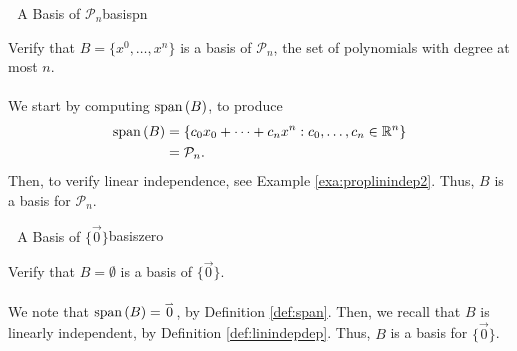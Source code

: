             \begin{example}{\Difficulty\,\Difficulty\,\Difficulty\,\,A Basis of \(\mathcal{P}_n\)}{basispn}

                Verify that \(B=\{x^0,\ldots,x^n\}\) is a basis of \(\mathcal{P}_n\), the set of polynomials with degree at most \(n\).
                \\
                \\
                We start by computing \(\text{span\,}(B)\), to produce
                \begin{align*}
                    \text{span\,}(B)&=\{c_0x_0+\cdots+c_nx^n:c_0,\ldots,c_n\in\mathbb{R}^n\} \\
                    &=\mathcal{P}_n.
                \end{align*}
                Then, to verify linear independence, see Example \ref{exa:proplinindep2}. Thus, \(B\) is a basis for \(\mathcal{P}_n\).
            \end{example}
            \begin{example}{\Difficulty\,\Difficulty\,\Difficulty\,\,A Basis of \(\{\vec{0}\}\)}{basiszero}

                Verify that \(B=\emptyset\) is a basis of \(\{\vec{0}\}\).
                \\
                \\
                We note that \(\text{span\,}(B)=\overset{_{\rightharpoonup}}{0}\), by Definition \ref{def:span}. Then, we recall that \(B\) is linearly independent, by Definition \ref{def:linindepdep}. Thus, \(B\) is a basis for \(\{\vec{0}\}\).
            
            \end{example}
            \pagebreak
